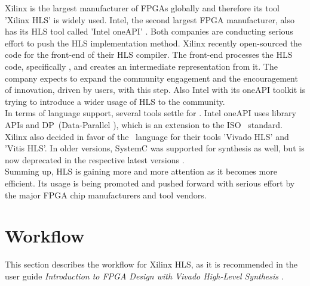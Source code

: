 Xilinx is the largest manufacturer of FPGAs globally and therefore its tool 'Xilinx HLS' is widely used.
Intel, the second largest FPGA manufacturer, also has its HLS tool called 'Intel oneAPI' \cite{IntelHLSOneAPI}.
Both companies are conducting serious effort to push the HLS implementation method.
Xilinx recently open-sourced the code for the front-end of their HLS compiler.
The front-end processes the HLS code, specifically \cplusplus, and creates an intermediate representation from it.
The company expects to expand the community engagement and the encouragement of innovation, driven by users, with this step.
Also Intel with its oneAPI toolkit is trying to introduce a wider usage of HLS to the community.\\

In terms of language support, several tools settle for \cplusplus.
Intel oneAPI uses library APIs and DP\cplusplus\ (Data-Parallel \cplusplus), which is an extension to the ISO \cplusplus\ standard.
Xilinx also decided in favor of the \cplusplus\ language for their tools 'Vivado HLS' and 'Vitis HLS'.
In older versions, SystemC was supported for synthesis as well, but is now deprecated in the respective latest versions \cite{VivadoHlsDeprecatesSystemC}.\\

Summing up, HLS is gaining more and more attention as it becomes more efficient.
Its usage is being promoted and pushed forward with serious effort by the major FPGA chip manufacturers and tool vendors.

%
%


\section{Workflow}
\label{sec:hls:workflow}

This section describes the workflow for Xilinx HLS, as it is recommended in the user guide \textit{Introduction to FPGA Design with Vivado High-Level Synthesis} \cite{VivadoUgHLSIntro}.\\

